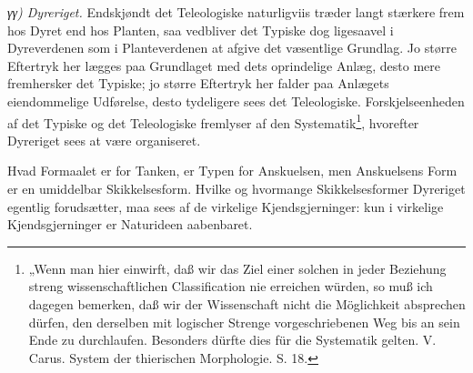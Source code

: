 \documentclass[12pt,a4paper]{book}
\begin{document}
\emph{γγ) Dyreriget.} Endskjøndt det Teleologiske naturligviis træder langt
stærkere frem hos Dyret end hos Planten, saa vedbliver det Typiske dog
ligesaavel i Dyreverdenen som i Planteverdenen at afgive det væsentlige
Grundlag. Jo større Eftertryk her lægges paa Grundlaget med dets oprindelige
Anlæg, desto mere fremhersker det Typiske; jo større Eftertryk her falder paa
Anlægets eiendommelige Udførelse, desto tydeligere sees det Teleologiske.
Forskjelseenheden af det Typiske og det Teleologiske fremlyser af den
Systematik\footnote{„Wenn man hier einwirft, daß wir das Ziel einer solchen in
jeder Beziehung streng wissenschaftlichen Classification nie erreichen würden,
so muß ich dagegen bemerken, daß wir der Wissenschaft nicht die Möglichkeit
absprechen dürfen, den derselben mit logischer Strenge vorgeschriebenen Weg bis
an sein Ende zu durchlaufen. Besonders dürfte dies für die Systematik gelten.
V. Carus. System der thierischen Morphologie. S. 18.}, hvorefter Dyreriget sees
at være organiseret.

Hvad Formaalet er for Tanken, er Typen for Anskuelsen, men Anskuelsens Form er
en umiddelbar Skikkelsesform. Hvilke og hvormange Skikkelsesformer Dyreriget
egentlig forudsætter, maa sees af de virkelige Kjendsgjerninger: kun i virkelige
Kjendsgjerninger er Naturideen aabenbaret.
\end{document}
